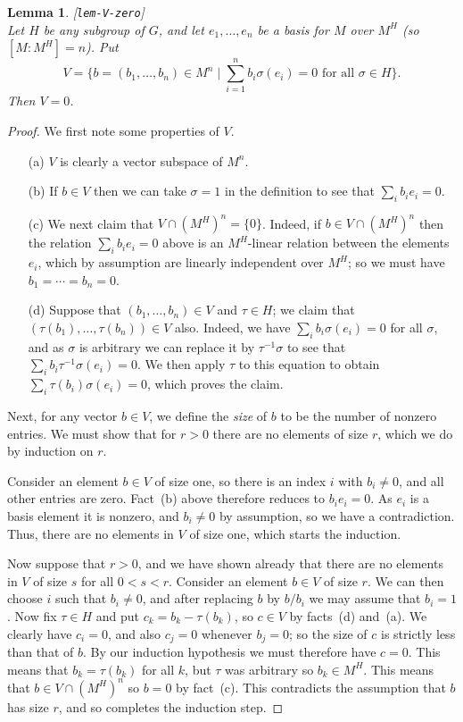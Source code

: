\documentclass{amsart}
\newcommand{\lbl}[1]{\label{#1}\textup{[\texttt{#1}]}\ \\}
\newcommand{\lbl}{\label}
\newcommand{\sg}        {\sigma}
\newcommand{\st}        {\;|\;}
\renewcommand{\:}{\colon}
\newtheorem{lemma}[theorem]{Lemma}
\theoremstyle{definition}
\begin{document}
\begin{lemma}\lbl{lem-V-zero}
 Let $H$ be any subgroup of $G$, and let $e_1,\dotsc,e_n$ be a basis
 for $M$ over $M^H$ (so $[M:M^H]=n$).  Put 
 \[ V = \{b=(b_1,\dotsc,b_n)\in M^n\st 
           \sum_{i=1}^n b_i\sg(e_i)=0 
           \text{ for all } \sg\in H\}.
 \]
 Then $V=0$.
\end{lemma}
\begin{proof}
 We first note some properties of $V$.  
 \begin{itemize}
  \item[(a)] $V$ is clearly a vector subspace of $M^n$.
  \item[(b)] If $b\in V$ then we can take $\sg=1$ in the definition to
   see that $\sum_ib_ie_i=0$.
  \item[(c)] We next claim that $V\cap(M^H)^n=\{0\}$.  Indeed, if
   $b\in V\cap(M^H)^n$ then the relation $\sum_ib_ie_i=0$ above is an
   $M^H$-linear relation between the elements $e_i$, which by
   assumption are linearly independent over $M^H$; so we must have
   $b_1=\dotsb= b_n=0$.
  \item[(d)] Suppose that $(b_1,\dotsc,b_n)\in V$ and $\tau\in H$; we
   claim that $(\tau(b_1),\dotsc,\tau(b_n))\in V$ also.  Indeed, we
   have $\sum_ib_i\sg(e_i)=0$ for all $\sg$, and as $\sg$ is arbitrary
   we can replace it by $\tau^{-1}\sg$ to see that
   $\sum_ib_i\tau^{-1}\sg(e_i)=0$.  We then apply $\tau$ to this
   equation to obtain $\sum_i\tau(b_i)\sg(e_i)=0$, which proves the
   claim. 
 \end{itemize}

 Next, for any vector $b\in V$, we define the \emph{size} of $b$ to be
 the number of nonzero entries.  We must show that for $r>0$ there are
 no elements of size $r$, which we do by induction on $r$.

 Consider an element $b\in V$ of size one, so there is an index $i$
 with $b_i\neq 0$, and all other entries are zero.  Fact~(b) above
 therefore reduces to $b_ie_i=0$.  As $e_i$ is a basis element it is
 nonzero, and $b_i\neq 0$ by assumption, so we have a contradiction.
 Thus, there are no elements in $V$ of size one, which starts the
 induction. 

 Now suppose that $r>0$, and we have shown already that there are no
 elements in $V$ of size $s$ for all $0<s<r$.  Consider an element
 $b\in V$ of size $r$.  We can then choose $i$ such that $b_i\neq 0$,
 and after replacing $b$ by $b/b_i$ we may assume that $b_i=1$.  Now
 fix $\tau\in H$ and put $c_k=b_k-\tau(b_k)$, so $c\in V$ by facts~(d)
 and~(a).  We clearly have $c_i=0$, and also $c_j=0$ whenever $b_j=0$;
 so the size of $c$ is strictly less than that of $b$.  By our
 induction hypothesis we must therefore have $c=0$.  This means that
 $b_k=\tau(b_k)$ for all $k$, but $\tau$ was arbitrary so
 $b_k\in M^H$.  This means that $b\in V\cap(M^H)^n$ so $b=0$ by
 fact~(c).  This contradicts the assumption that $b$ has size $r$, and
 so completes the induction step.
\end{proof}
\end{document}
